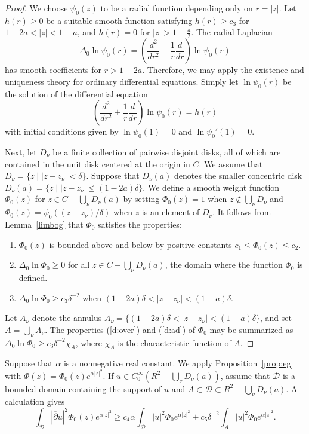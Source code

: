 \documentclass[manuscript, printscheme]{aomart}
\newtheorem[{}\it]{thm}{Theorem}[section]
\theoremstyle{definition}
\newtheorem*[{}\it]{notation}{Notation}
\newcommand{\lemref}[1]{Lemma~\ref{#1}}
\newcommand{\envert}[1]{\left\lvert#1\right\rvert}
\let\abs=\envert
\begin{document}
\begin{proof}
We choose $\psi_0(z)$ to be a radial function depending only on $r=\abs{z}$.
Let $h(r)\geq 0$ be a suitable smooth function satisfying $h(r)\geq c_3$
for $1-2a<\abs{z}<1-a$, and $h(r)=0$ for $\abs{z}>1-\tfrac a2$. The radial
Laplacian
\[\Delta_0\ln\psi_0(r)=\left(\frac {d^2}{dr^2}+\frac
1r\frac d{dr}\right)\ln\psi_0(r)\]
has smooth coefficients for $r>1-2a$. Therefore, we may
apply the existence and uniqueness theory for ordinary differential
equations. Simply let $\ln \psi_0(r)$ be the solution of the differential
equation
\[\left(\frac{d^2}{dr^2}+\frac 1r\frac d{dr}\right)\ln \psi_0(r)=h(r)\]
with initial conditions given by $\ln \psi_0(1)=0$ and
$\ln\psi_0'(1)=0$.

Next, let $D_\nu$ be a finite collection of pairwise disjoint disks,
all of which are contained in the unit disk centered at the origin in
$C$. We assume that $D_\nu=\{z\mid \abs{z-z_\nu}<\delta\}$. Suppose that
$D_\nu(a)$ denotes the smaller concentric disk $D_\nu(a)=\{z\mid
\abs{z-z_\nu}\leq (1-2a)\delta\}$. We define a smooth weight function
$\Phi_0(z)$ for $z\in C-\bigcup_\nu D_\nu(a)$ by setting $\Phi_
0(z)=1$ when $z\notin \bigcup_\nu D_\nu$ and $\Phi_
0(z)=\psi_0((z-z_\nu)/\delta)$ when $z$ is an element of $D_\nu$. It
follows from \lemref{limbog} that $\Phi_ 0$ satisfies the properties:
\begin{enumerate}
\renewcommand{\labelenumi}{(\roman{enumi})}
\item \label{boundab}$\Phi_ 0(z)$ is bounded above and below by
positive constants $c_1\leq \Phi_ 0(z)\leq c_2$.
\item \label{d:over}$\Delta_0\ln\Phi_ 0\geq 0$ for all
$z\in C-\bigcup_\nu D_\nu(a)$,
the domain where the function $\Phi_ 0$ is defined.
\item \label{d:ad}$\Delta_0\ln\Phi_ 0\geq c_3\delta^{-2}$
when $(1-2a)\delta<\abs{z-z_\nu}<(1-a)\delta$.
\end{enumerate}
Let $A_\nu$ denote the annulus $A_\nu=\{(1-2a)\delta<\abs{z-z_\nu}<(1-a)
\delta \}$, and set $A=\bigcup_\nu A_\nu$. The
properties (\ref{d:over}) and (\ref{d:ad}) of $\Phi_ 0$
may be summarized as $\Delta_0\ln \Phi_ 0\geq c_3\delta^{-2}\chi_A$,
where $\chi _A$ is the characteristic function of $A$.
\end{proof}

Suppose that $\alpha$ is a nonnegative real constant. We apply
Proposition~\ref{prop:eg} with $\Phi(z)=\Phi_ 0(z) e^{\alpha\abs{z}^2}$. If
$u\in C^\infty_0(R^2-\bigcup_\nu D_\nu(a))$, assume that $\mathcal{D}$
is a bounded domain containing the support of $u$ and $A\subset
\mathcal{D}\subset R^2-\bigcup_\nu D_\nu(a)$. A calculation gives
\[\int_{\mathcal{D}}\abs{\overline\partial u}^2\Phi_ 0(z) e^{\alpha\abs{z}^2}
\geq c_4\alpha\int_{\mathcal{D}}\abs{u}^2\Phi_ 0e^{\alpha\abs{z}^2}
+c_5\delta^{-2}\int_ A\abs{u}^2\Phi_ 0e^{\alpha\abs{z}^2}.\]
\end{document}
